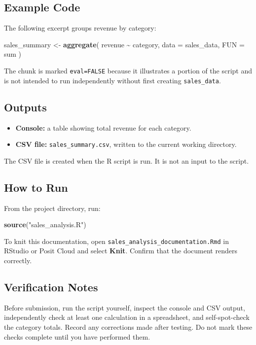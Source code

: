 \documentclass[
]{article}
\newenvironment{Shaded}{\begin{snugshade}}{\end{snugshade}}
\newcommand{\AttributeTok}[1]{\textcolor[rgb]{0.13,0.29,0.53}{#1}}
\newcommand{\FunctionTok}[1]{\textcolor[rgb]{0.13,0.29,0.53}{\textbf{#1}}}
\newcommand{\NormalTok}[1]{#1}
\newcommand{\OtherTok}[1]{\textcolor[rgb]{0.56,0.35,0.01}{#1}}
\newcommand{\SpecialCharTok}[1]{\textcolor[rgb]{0.81,0.36,0.00}{\textbf{#1}}}
\newcommand{\StringTok}[1]{\textcolor[rgb]{0.31,0.60,0.02}{#1}}
\providecommand{\tightlist}{%
  \setlength{\itemsep}{0pt}\setlength{\parskip}{0pt}}
\begin{document}
\subsection{Example Code}\label{example-code}

The following excerpt groups revenue by category:

\begin{Shaded}
\begin{Highlighting}[]
\NormalTok{sales\_summary }\OtherTok{\textless{}{-}} \FunctionTok{aggregate}\NormalTok{(}
\NormalTok{  revenue }\SpecialCharTok{\textasciitilde{}}\NormalTok{ category,}
  \AttributeTok{data =}\NormalTok{ sales\_data,}
  \AttributeTok{FUN =}\NormalTok{ sum}
\NormalTok{)}
\end{Highlighting}
\end{Shaded}

The chunk is marked \texttt{eval=FALSE} because it illustrates a portion
of the script and is not intended to run independently without first
creating \texttt{sales\_data}.

\subsection{Outputs}\label{outputs}

\begin{itemize}
\tightlist
\item
  \textbf{Console:} a table showing total revenue for each category.
\item
  \textbf{CSV file:} \texttt{sales\_summary.csv}, written to the current
  working directory.
\end{itemize}

The CSV file is created when the R script is run. It is not an input to
the script.

\subsection{How to Run}\label{how-to-run}

From the project directory, run:

\begin{Shaded}
\begin{Highlighting}[]
\FunctionTok{source}\NormalTok{(}\StringTok{"sales\_analysis.R"}\NormalTok{)}
\end{Highlighting}
\end{Shaded}

To knit this documentation, open
\texttt{sales\_analysis\_documentation.Rmd} in RStudio or Posit Cloud
and select \textbf{Knit}. Confirm that the document renders correctly.

\subsection{Verification Notes}\label{verification-notes}

Before submission, run the script yourself, inspect the console and CSV
output, independently check at least one calculation in a spreadsheet,
and self-spot-check the category totals. Record any corrections made
after testing. Do not mark these checks complete until you have
performed them.
\end{document}
